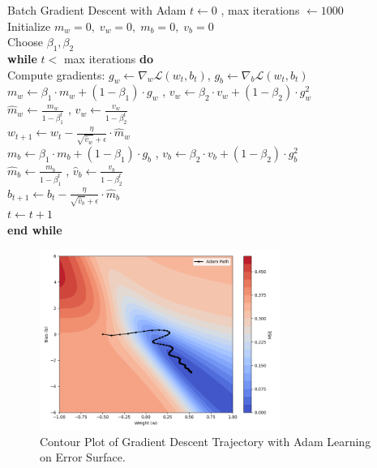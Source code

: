 \begin{algobox}{Batch Gradient Descent with Adam}
\( t \gets 0 \)  , \quad max iterations \( \gets 1000 \) \\
Initialize \( m_w = 0, \; v_w = 0, \; m_b = 0, \; v_b = 0 \) \\
Choose \(\beta_1, \beta_2\) \\

\textbf{while} \( t < \) max iterations \textbf{do} \\
\hspace*{1em} Compute gradients: \( g_w \gets \nabla_w \mathcal{L}(w_t, b_t) \), \( g_b \gets \nabla_b \mathcal{L}(w_t, b_t) \) \\

\hspace*{1em} \( m_w \gets \beta_1 \cdot m_w + (1 - \beta_1) \cdot g_w \) , \quad \( v_w \gets \beta_2 \cdot v_w + (1 - \beta_2) \cdot g_w^2 \) \\
\hspace*{1em} \( \hat{m}_w \gets \frac{m_w}{1 - \beta_1^t} \) , \quad \( \hat{v}_w \gets \frac{v_w}{1 - \beta_2^t} \) \\
\hspace*{1em} \( w_{t+1} \gets w_t - \frac{\eta}{\sqrt{\hat{v}_w} + \epsilon} \cdot \hat{m}_w \) \\

\hspace*{1em} \( m_b \gets \beta_1 \cdot m_b + (1 - \beta_1) \cdot g_b \) , \quad \( v_b \gets \beta_2 \cdot v_b + (1 - \beta_2) \cdot g_b^2 \) \\
\hspace*{1em} \( \hat{m}_b \gets \frac{m_b}{1 - \beta_1^t} \) , \quad \( \hat{v}_b \gets \frac{v_b}{1 - \beta_2^t} \) \\
\hspace*{1em} \( b_{t+1} \gets b_t - \frac{\eta}{\sqrt{\hat{v}_b} + \epsilon} \cdot \hat{m}_b \) \\

\hspace*{1em} \( t \gets t + 1 \) \\
\textbf{end while}
\end{algobox}


\begin{figure}[h!]
    \centering
    \includegraphics[width=0.7\textwidth]{content/section01/chapter01/figs/adam_gd_contour.png}
    \caption{Contour Plot of Gradient Descent Trajectory with Adam Learning on Error Surface.}
\end{figure}

